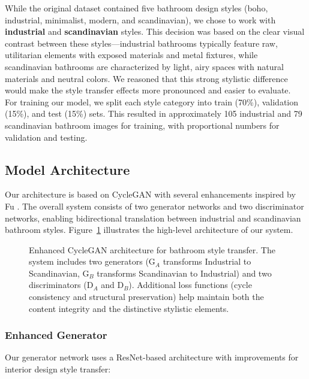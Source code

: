 \documentclass[twocolumn,superscriptaddress,aps]{revtex4-1}
\begin{document}
While the original dataset contained five bathroom design styles (boho, industrial, minimalist, modern, and scandinavian), we chose to work with \textbf{industrial} and \textbf{scandinavian} styles. This decision was based on the clear visual contrast between these styles—industrial bathrooms typically feature raw, utilitarian elements with exposed materials and metal fixtures, while scandinavian bathrooms are characterized by light, airy spaces with natural materials and neutral colors. We reasoned that this strong stylistic difference would make the style transfer effects more pronounced and easier to evaluate.\\

For training our model, we split each style category into train (70\%), validation (15\%), and test (15\%) sets. This resulted in approximately 105 industrial and 79 scandinavian bathroom images for training, with proportional numbers for validation and testing.

\subsection{Model Architecture}

Our architecture is based on CycleGAN \cite{zhu2017unpaired} with several enhancements inspired by Fu \cite{fu2022digital}. The overall system consists of two generator networks and two discriminator networks, enabling bidirectional translation between industrial and scandinavian bathroom styles. Figure~\ref{fig:architecture} illustrates the high-level architecture of our system.

\begin{figure}[htbp]
    \centering
    \caption{Enhanced CycleGAN architecture for bathroom style transfer. The system includes two generators (G$_A$ transforms Industrial to Scandinavian, G$_B$ transforms Scandinavian to Industrial) and two discriminators (D$_A$ and D$_B$). Additional loss functions (cycle consistency and structural preservation) help maintain both the content integrity and the distinctive stylistic elements.}
    \label{fig:architecture}
\end{figure}

\subsubsection{Enhanced Generator}

Our generator network uses a ResNet-based architecture with improvements for interior design style transfer:
\end{document}
